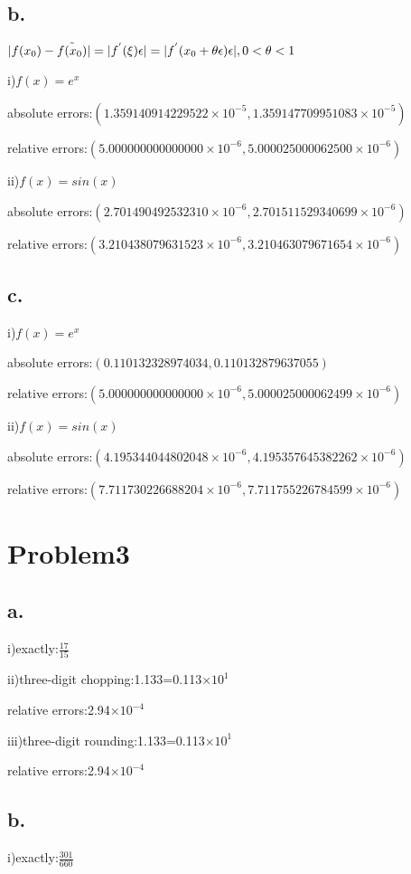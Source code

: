 \documentclass{article}
\begin{document}
\subsection{b.}
$|f(x_0)-\Tilde{f(x_0)}|=|f^{'}(\xi) \epsilon|=|f^{'}(x_0+\theta \epsilon) \epsilon|,0<\theta<1$

i)$f(x)=e^x$

absolute errors:$ (1.359140914229522\times 10^{-5},1.359147709951083 \times 10^{-5})$

relative errors:$(5.000000000000000\times 10^{-6},5.000025000062500\times 10^{-6})$

ii)$f(x)=sin(x)$

absolute errors:$ (2.701490492532310\times 10^{-6},2.701511529340699\times 10^{-6})$

relative errors:$(3.210438079631523\times 10^{-6},3.210463079671654\times 10^{-6})$
\subsection{c.}
i)$f(x)=e^x$

absolute errors:$ (0.110132328974034,0.110132879637055)$

relative errors:$(5.000000000000000\times 10^{-6},5.000025000062499\times 10^{-6})$

ii)$f(x)=sin(x)$

absolute errors:$ (4.195344044802048\times 10^{-6},4.195357645382262\times 10^{-6})$

relative errors:$(7.711730226688204\times 10^{-6},7.711755226784599\times 10^{-6})$

\section{Problem3}
\subsection{a.}
i)exactly:$\frac{17}{15}$

ii)three-digit chopping:1.133=0.113$\times 10^{1}$

relative errors:2.94$\times 10^{-4}$

iii)three-digit rounding:1.133=0.113$\times 10^{1}$

relative errors:2.94$\times 10^{-4}$


\subsection{b.}
i)exactly:$\frac{301}{660}$
\end{document}
